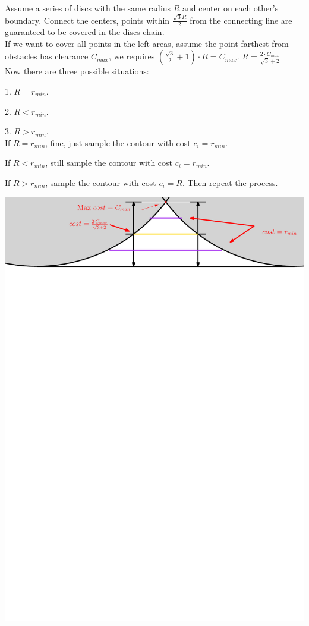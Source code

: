 \documentclass[12pt]{article}
\begin{document}
  Assume a series of discs with the same radius $R$ and center on each other's boundary. Connect the centers, points within $\frac{\sqrt{3}R}{2}$ from the connecting line are guaranteed to be covered in the discs chain.\\
  
  If we want to cover all points in the left areas, assume the point farthest from obstacles has clearance $C_{max}$, we requires $(\frac{\sqrt{3}}{2} + 1) \cdot R = C_{max}$. $R = \frac{ 2\cdot C_{max} }{\sqrt{3}+2}$\\
  
  Now there are three possible situations: 
  
  1. $R = r_{min}$. 
  
  2. $R < r_{min}$.
  
  3. $R > r_{min}$.\\  
  
  If $R = r_{min}$, fine, just sample the contour with cost $c_i = r_{min}$.
  
  If $R < r_{min}$, still sample the contour with cost $c_i = r_{min}$.
  
  If $R > r_{min}$, sample the contour with cost $c_i = R$. Then repeat the process.
  
  \includegraphics[scale=0.6]{./sampling2d/3.pdf}
  
\end{document}
